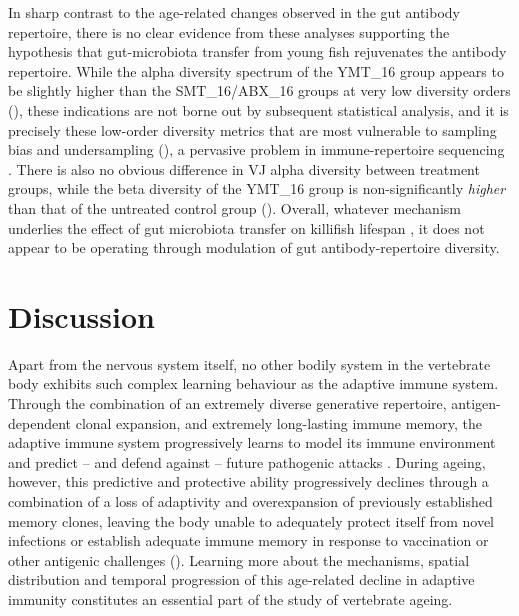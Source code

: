 In sharp contrast to the age-related changes observed in the gut antibody repertoire, there is no clear evidence from these analyses supporting the hypothesis that gut-microbiota transfer from young fish rejuvenates the antibody repertoire. While the alpha diversity spectrum of the YMT\_16 group appears to be slightly higher than the SMT\_16/ABX\_16 groups at very low diversity orders (), these indications are not borne out by subsequent statistical analysis, and it is precisely these low-order diversity metrics that are most vulnerable to sampling bias and undersampling (), a pervasive problem in immune-repertoire sequencing \parencite{mora2016diversity}. There is also no obvious difference in VJ alpha diversity between treatment groups, while the beta diversity of the YMT\_16 group is non-significantly \textit{higher} than that of the untreated control group (). Overall, whatever mechanism underlies the effect of gut microbiota transfer on killifish lifespan \parencite{smith2017microbiota}, it does not appear to be operating through modulation of gut antibody-repertoire diversity.

\FloatBarrier
\clearpage

\section{Discussion}
\label{sec:igseq_discussion}

Apart from the nervous system itself, no other bodily system in the vertebrate body exhibits such complex learning behaviour as the adaptive immune system. Through the combination of an extremely diverse generative repertoire, antigen-dependent clonal expansion, and extremely long-lasting immune memory, the adaptive immune system progressively learns to model its immune environment and predict -- and defend against -- future pathogenic attacks \parencite{mayer2018memory}. During ageing, however, this predictive and protective ability progressively declines through a combination of a loss of adaptivity and overexpansion of previously established memory clones, leaving the body unable to adequately protect itself from novel infections or establish adequate immune memory in response to vaccination or other antigenic challenges (). Learning more about the mechanisms, spatial distribution and temporal progression of this age-related decline in adaptive immunity constitutes an essential part of the study of vertebrate ageing.

